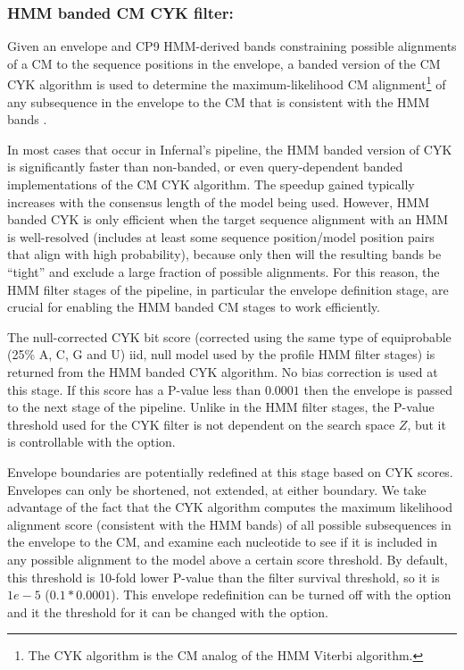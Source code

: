 \begin{sreoutput}
\subsubsection{HMM banded CM CYK filter:}

Given an envelope and CP9 HMM-derived bands constraining possible
alignments of a CM to the sequence positions in the envelope, a banded
version of the CM CYK algorithm is used to determine the
maximum-likelihood CM alignment\footnote{The CYK algorithm is the CM
analog of the HMM Viterbi algorithm.} of any subsequence in the
envelope to the CM that is consistent with the HMM bands \cite{Nawrocki09}.

In most cases that occur in Infernal's pipeline, the HMM banded
version of CYK is significantly faster than non-banded, or even
query-dependent banded \cite{NawrockiEddy07} implementations of the CM
CYK algorithm. The speedup gained typically increases with the
consensus length of the model being used. However, HMM banded CYK is
only efficient when the target sequence alignment with an HMM is
well-resolved (includes at least some sequence position/model position
pairs that align with high probability), because only then will 
the resulting bands be ``tight'' and exclude a large fraction of
possible alignments. For this reason, the HMM filter stages of the
pipeline, in particular the envelope definition stage, are crucial for
enabling the HMM banded CM stages to work efficiently. 

The null-corrected CYK bit score (corrected using the same type of
equiprobable (25\% A, C, G and U) iid, null model used by the profile
HMM filter stages) is returned from the HMM banded CYK algorithm. No
bias correction is used at this stage. If this score has a P-value
less than $0.0001$ then the envelope is passed to the next stage of
the pipeline. Unlike in the HMM filter stages, the P-value threshold
used for the CYK filter is not dependent on the search space $Z$, but
it is controllable with the  option.

Envelope boundaries are potentially redefined at this stage based on
CYK scores. Envelopes can only be shortened, not extended, at either
boundary. We take advantage of the fact that the CYK algorithm
computes the maximum likelihood alignment score (consistent with the
HMM bands) of all possible subsequences in the envelope to the CM, and
examine each nucleotide to see if it is included in any possible
alignment to the model above a certain score threshold. By default,
this threshold is 10-fold lower P-value than the filter survival
threshold, so it is $1e-5$ ($0.1*0.0001$). This envelope redefinition
can be turned off with the  option and it the
threshold for it can be changed with the  option.


\end{sreoutput}
